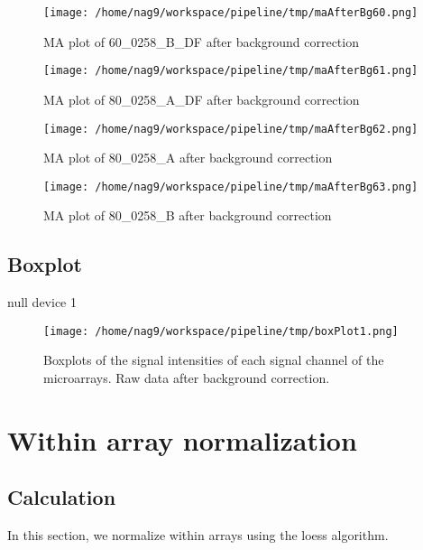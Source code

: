 \documentclass[titlepage]{article}
\begin{document}
\begin{figure}[htb!]
\centering
\texttt{[image: /home/nag9/workspace/pipeline/tmp/maAfterBg60.png]}
\caption{MA plot of 60\_0258\_B\_DF after background correction}
\end{figure}\pagebreak
\begin{figure}[htb!]
\centering
\texttt{[image: /home/nag9/workspace/pipeline/tmp/maAfterBg61.png]}
\caption{MA plot of 80\_0258\_A\_DF after background correction}
\end{figure}\pagebreak
\begin{figure}[htb!]
\centering
\texttt{[image: /home/nag9/workspace/pipeline/tmp/maAfterBg62.png]}
\caption{MA plot of 80\_0258\_A after background correction}
\end{figure}\pagebreak
\begin{figure}[htb!]
\centering
\texttt{[image: /home/nag9/workspace/pipeline/tmp/maAfterBg63.png]}
\caption{MA plot of 80\_0258\_B after background correction}
\end{figure}\pagebreak

\subsection{Boxplot}
\begin{Schunk}
\begin{Soutput}
null device 
          1 
\end{Soutput}
\end{Schunk}
\begin{figure}[htb!]
\centering
\texttt{[image: /home/nag9/workspace/pipeline/tmp/boxPlot1.png]}
\caption{Boxplots of the signal intensities of each signal channel of the microarrays. Raw data after background correction.}\end{figure}
\pagebreak


\section{Within array normalization}
\subsection{Calculation}
In this section, we normalize within arrays using the loess algorithm. 
\end{document}
